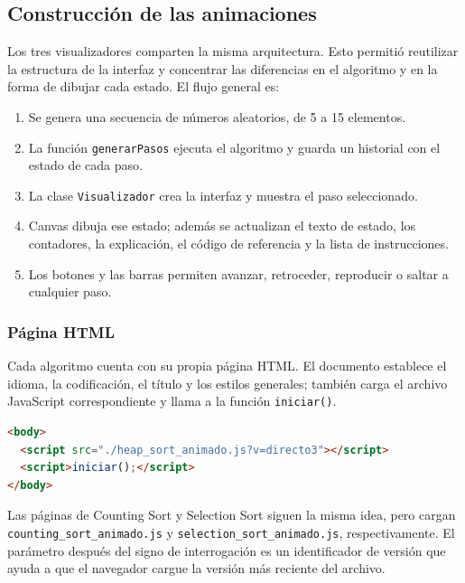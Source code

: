 \documentclass[12pt,a4paper]{article}
\begin{document}
\subsection{Construcción de las animaciones}

Los tres visualizadores comparten la misma arquitectura. Esto permitió reutilizar la estructura de la interfaz y concentrar las diferencias en el algoritmo y en la forma de dibujar cada estado. El flujo general es:

\begin{enumerate}
    \item Se genera una secuencia de números aleatorios, de 5 a 15 elementos.
    \item La función \texttt{generarPasos} ejecuta el algoritmo y guarda un historial con el estado de cada paso.
    \item La clase \texttt{Visualizador} crea la interfaz y muestra el paso seleccionado.
    \item Canvas dibuja ese estado; además se actualizan el texto de estado, los contadores, la explicación, el código de referencia y la lista de instrucciones.
    \item Los botones y las barras permiten avanzar, retroceder, reproducir o saltar a cualquier paso.
\end{enumerate}

\subsubsection{Página HTML}

Cada algoritmo cuenta con su propia página HTML. El documento establece el idioma, la codificación, el título y los estilos generales; también carga el archivo JavaScript correspondiente y llama a la función \texttt{iniciar()}.

\begin{lstlisting}[language=HTML, caption={Carga del visualizador de Heap Sort en HTML}]
<body>
  <script src="./heap_sort_animado.js?v=directo3"></script>
  <script>iniciar();</script>
</body>
\end{lstlisting}

Las páginas de Counting Sort y Selection Sort siguen la misma idea, pero cargan \texttt{counting\_sort\_animado.js} y \texttt{selection\_sort\_animado.js}, respectivamente. El parámetro después del signo de interrogación es un identificador de versión que ayuda a que el navegador cargue la versión más reciente del archivo.
\end{document}
